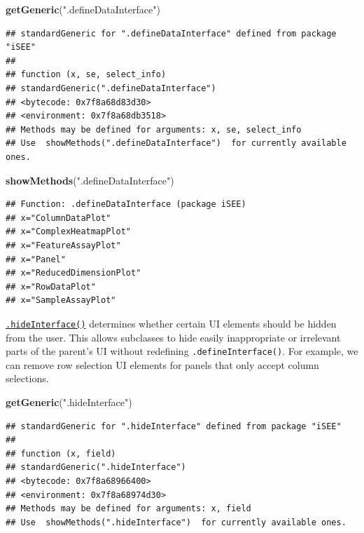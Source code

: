 \documentclass[
]{book}
\newenvironment{Shaded}{\begin{snugshade}}{\end{snugshade}}
\newcommand{\KeywordTok}[1]{\textcolor[rgb]{0.13,0.29,0.53}{\textbf{#1}}}
\newcommand{\NormalTok}[1]{#1}
\newcommand{\StringTok}[1]{\textcolor[rgb]{0.31,0.60,0.02}{#1}}
\begin{document}
\begin{Shaded}
\begin{Highlighting}[]
\KeywordTok{getGeneric}\NormalTok{(}\StringTok{".defineDataInterface"}\NormalTok{)}
\end{Highlighting}
\end{Shaded}

\begin{verbatim}
## standardGeneric for ".defineDataInterface" defined from package "iSEE"
## 
## function (x, se, select_info) 
## standardGeneric(".defineDataInterface")
## <bytecode: 0x7f8a68d83d30>
## <environment: 0x7f8a68db3518>
## Methods may be defined for arguments: x, se, select_info
## Use  showMethods(".defineDataInterface")  for currently available ones.
\end{verbatim}

\begin{Shaded}
\begin{Highlighting}[]
\KeywordTok{showMethods}\NormalTok{(}\StringTok{".defineDataInterface"}\NormalTok{)}
\end{Highlighting}
\end{Shaded}

\begin{verbatim}
## Function: .defineDataInterface (package iSEE)
## x="ColumnDataPlot"
## x="ComplexHeatmapPlot"
## x="FeatureAssayPlot"
## x="Panel"
## x="ReducedDimensionPlot"
## x="RowDataPlot"
## x="SampleAssayPlot"
\end{verbatim}

\href{https://isee.github.io/iSEE/reference/interface-generics.html}{\texttt{.hideInterface()}} determines whether certain UI elements should be hidden from the user.
This allows subclasses to hide easily inappropriate or irrelevant parts of the parent's UI without redefining \texttt{.defineInterface()}.
For example, we can remove row selection UI elements for panels that only accept column selections.

\begin{Shaded}
\begin{Highlighting}[]
\KeywordTok{getGeneric}\NormalTok{(}\StringTok{".hideInterface"}\NormalTok{)}
\end{Highlighting}
\end{Shaded}

\begin{verbatim}
## standardGeneric for ".hideInterface" defined from package "iSEE"
## 
## function (x, field) 
## standardGeneric(".hideInterface")
## <bytecode: 0x7f8a68966400>
## <environment: 0x7f8a68974d30>
## Methods may be defined for arguments: x, field
## Use  showMethods(".hideInterface")  for currently available ones.
\end{verbatim}
\end{document}
